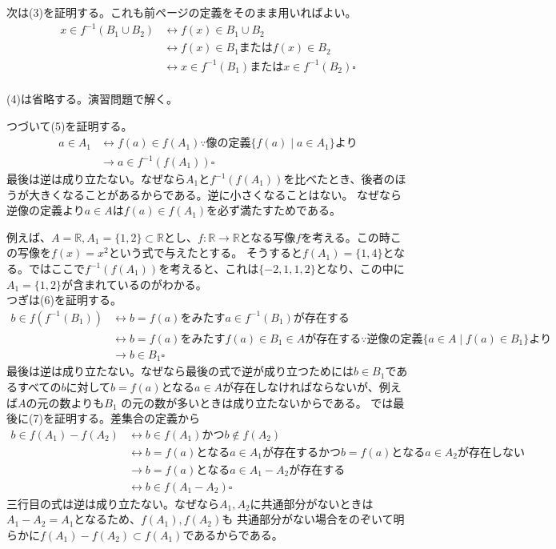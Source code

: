 \documentclass[a4j,dvipdfmx]{jsarticle}
\begin{document}
次は(3)を証明する。これも前ページの定義をそのまま用いればよい。
\begin{align*}
    x\in f^{-1}(B_1\cup B_2)
    &\leftrightarrow f(x)\in B_1\cup B_2\\
    &\leftrightarrow f(x)\in B_1またはf(x)\in B_2\\
    &\leftrightarrow x\in f^{-1}(B_1)またはx\in f^{-1}(B_2)\square
\end{align*}
\hrulefill\\
(4)は省略する。演習問題で解く。\\
\hrulefill

つづいて(5)を証明する。\\
\begin{align*}
    a\in A_1
    &\leftrightarrow f(a)\in f(A_1) \because 像の定義 \{f(a)\mid a\in A_1\} より\\
    &\rightarrow a\in f^{-1}(f(A_1))\square 
\end{align*}
最後は逆は成り立たない。なぜなら$A_1$と$f^{-1}(f(A_1))$を比べたとき、後者のほうが大きくなることがあるからである。逆に小さくなることはない。
なぜなら逆像の定義より$a \in A$は$f(a)\in f(A_1)$を必ず満たすためである。

例えば、$A=\mathbb{R},A_1=\{1,2\}\subset\mathbb{R}$とし、$f:\mathbb{R}\to\mathbb{R}$となる写像$f$を考える。この時この写像を$f(x)=x^2$という式で与えたとする。
そうすると$f(A_1)=\{1,4\}$となる。ではここで$f^{-1}(f(A_1))$を考えると、これは$\{-2,1,1,2\}$となり、この中に$A_1=\{1,2\}$が含まれているのがわかる。\\

つぎは(6)を証明する。
\begin{align*}
    b\in f(f^{-1}(B_1))
    &\leftrightarrow b=f(a)をみたすa\in f^{-1}(B_1)が存在する\\
    &\leftrightarrow b=f(a)をみたすf(a)\in B_1 \in Aが存在する\because 逆像の定義 \{a\in A\mid f(a)\in B_1\}より\\
    &\rightarrow b\in B_1\square
\end{align*}
最後は逆は成り立たない。なぜなら最後の式で逆が成り立つためには$b\in B_1$であるすべての$b$に対して$b=f(a)$となる$a\in A$が存在しなければならないが、例えば$A$の元の数よりも$B_1$
の元の数が多いときは成り立たないからである。
\newpage
では最後に(7)を証明する。差集合の定義から
\begin{align*}
    b\in f(A_1)-f(A_2) 
    &\leftrightarrow b\in f(A_1)かつb\notin f(A_2)\\
    &\leftrightarrow b=f(a)となるa\in A_1が存在するかつb=f(a)となるa\in A_2が存在しない\\
    &\rightarrow b=f(a)となるa\in A_1-A_2が存在する\\
    &\leftrightarrow b\in f(A_1-A_2)\square
\end{align*}
三行目の式は逆は成り立たない。なぜなら$A_1,A_2$に共通部分がないときは$A_1-A_2=A_1$となるため、$f(A_1),f(A_2)$も
共通部分がない場合をのぞいて明らかに$f(A_1)-f(A_2)\subset f(A_1)$であるからである。
\end{document}
